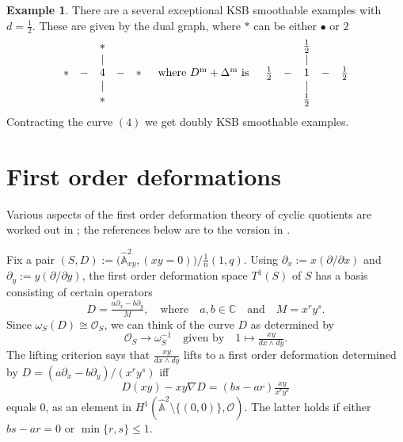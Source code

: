 \documentclass{amsart}
\theoremstyle{definition}
\newtheorem{exmp}[thm]{Example}
\theoremstyle{remark}
\renewcommand{\c}[0]{{\mathbb C}}
\renewcommand{\o}[0]{{\mathcal O}}
\renewcommand{\a}[0]{\hat{\mathbb A}}
\newcommand{\qtq}[1]{\quad\mbox{#1}\quad}
\newcommand{\dx}[0]{\partial_x}
\newcommand{\dy}[0]{\partial_y}
\begin{document}
\begin{exmp} \label{1/2.2.exmp} There are a several exceptional  KSB smoothable
  examples with $d=\frac12$. These are given by the dual graph, where $\ast$ can be either $\bullet$ or $2$
    $$
  \begin{array}{ccccc}
    && \ast &&\\
&& | &&\\
    \ast & - & 4  & - &   \ast\\
    && | &&\\
     && \ast &&
  \end{array}
  \qtq{where $D^{\rm m}+\Delta^{\rm m}$ is}
  \begin{array}{ccccc}
    && \tfrac12 &&\\
&& | &&\\
     \tfrac12 & - & 1  & - &    \tfrac12\\
    && | &&\\
     &&  \tfrac12 &&
  \end{array}
  $$
  Contracting the curve $(4)$ we get 
   doubly KSB smoothable examples.
\end{exmp}






\section{First order deformations}\label{first.ord.sec}


Various aspects of the first order deformation theory of cyclic quotients are worked out in \cite{k-alt}; the references below are to the version in
\cite[Sec.6.6]{k-modbook}.


Fix a pair  $(S, D):=\bigl(\a^2_{xy}, (xy=0)\bigr)/\tfrac1{n}(1,q)$.
Using  $\dx:=x(\partial/\partial x)$ and  $\dy:=y(\partial/\partial y)$,
the first order deformation space  $T^1(S)$ of $S$ has a basis consisting of certain operators
$$
D=\tfrac{a\dx-b\dy}{M},\qtq{where} a,b\in \c\qtq{and}  M=x^ry^s.
$$
Since  $\omega_S(D)\cong \o_S$, we can think of the curve $D$ as determined by
$$
\o_S\to \omega_S^{-1}\qtq{given by}  1\mapsto \tfrac{xy}{dx\wedge dy}.
$$
The lifting criterion \cite[6.58]{k-modbook} says that
$\frac{xy}{dx\wedge dy} $ lifts to a first order deformation determined by
 $D=(a\dx-b\dy)/(x^ry^s)$ iff
$$
D(xy)-xy\nabla D= (bs-ar) \tfrac{xy}{x^ry^s}
$$
equals $0$, as an element in $H^1(\a^2\setminus\{(0,0)\}, \o)$.
The latter holds if either $bs-ar=0$ or $\min\{r,s\}\leq 1$.
\end{document}
